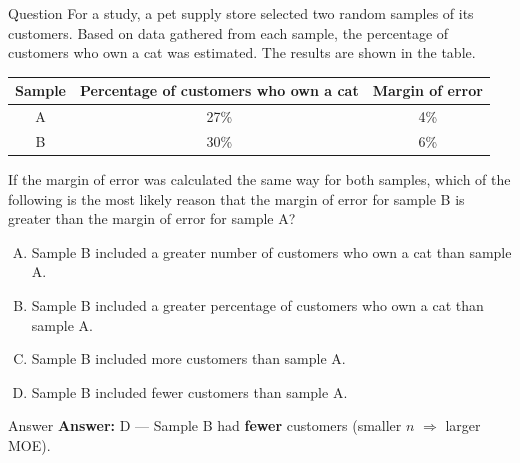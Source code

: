 \documentclass{beamer}
\begin{document}
\begin{frame}{Question}
\small
For a study, a pet supply store selected two random samples of its customers. Based on data gathered from each sample, the percentage of customers who own a cat was estimated. The results are shown in the table.

\begin{center}
\begin{tabular}{|c|c|c|}
\hline
\textbf{Sample} & \textbf{Percentage of customers who own a cat} & \textbf{Margin of error} \\
\hline
A & 27\% & 4\% \\
B & 30\% & 6\% \\
\hline
\end{tabular}
\end{center}

If the margin of error was calculated the same way for both samples, which of the following is the most likely reason that the margin of error for sample B is greater than the margin of error for sample A?

\begin{enumerate}[A.]
    \item Sample B included a greater number of customers who own a cat than sample A.
    \item Sample B included a greater percentage of customers who own a cat than sample A.
    \item Sample B included more customers than sample A.
    \item Sample B included fewer customers than sample A.
\end{enumerate}
\end{frame}


\begin{frame}{Answer}
\textbf{Answer:} D — Sample B had \textbf{fewer} customers (smaller $n$ $\Rightarrow$ larger MOE).
\end{frame}
\end{document}
